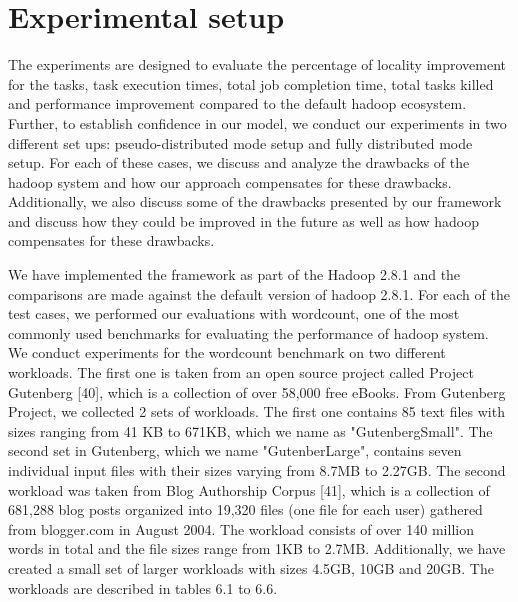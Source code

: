 \documentclass[print,ms]{nuthesis}%
\begin{document}
\section{Experimental setup}
The experiments are designed to evaluate the percentage of locality improvement for the tasks, task execution times, total job completion time, total tasks killed and performance improvement compared to the default hadoop ecosystem. Further, to establish confidence in our model, we conduct our experiments in two different set ups: pseudo-distributed mode setup and fully distributed mode setup. For each of these cases, we discuss and analyze the drawbacks of the hadoop system and how our approach compensates for these drawbacks. Additionally, we also discuss some of the drawbacks presented by our framework and discuss how they could be improved in the future as well as how hadoop compensates for these drawbacks. %

We have implemented the framework as part of the Hadoop 2.8.1 and the comparisons are made against the default version of hadoop 2.8.1. For each of the test cases, we performed our evaluations with wordcount, one of the most commonly used benchmarks for evaluating the performance of hadoop system. We conduct experiments for the wordcount benchmark on two different workloads. The first one is taken from an open source project called Project Gutenberg [40], which is a collection of over 58,000 free eBooks. From Gutenberg Project, we collected 2 sets of workloads. The first one contains 85 text files with sizes ranging from 41 KB to 671KB, which we name as "GutenbergSmall". The second set in Gutenberg, which we name "GutenberLarge", contains seven individual input files with their sizes varying from 8.7MB to 2.27GB. The second workload was taken from Blog Authorship Corpus [41], which is a collection of 681,288 blog posts organized into 19,320 files (one file for each user) gathered from blogger.com in August 2004. The workload consists of over 140 million words in total and the file sizes range from 1KB to 2.7MB. Additionally, we have created a small set of larger workloads with sizes 4.5GB, 10GB and 20GB.  The workloads are described in tables 6.1 to 6.6.
	
\end{document}

